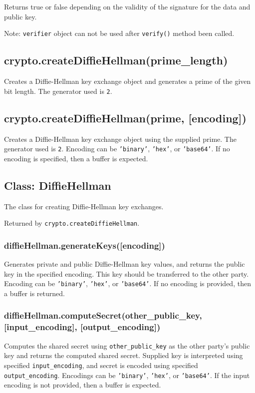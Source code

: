 Returns true or false depending on the validity of the signature for the
data and public key.

Note: \texttt{verifier} object can not be used after \texttt{verify()}
method been called.

\subsection{crypto.createDiffieHellman(prime\_length)}

Creates a Diffie-Hellman key exchange object and generates a prime of
the given bit length. The generator used is \texttt{2}.

\subsection{crypto.createDiffieHellman(prime, {[}encoding{]})}

Creates a Diffie-Hellman key exchange object using the supplied prime.
The generator used is \texttt{2}. Encoding can be \texttt{'binary'},
\texttt{'hex'}, or \texttt{'base64'}. If no encoding is specified, then
a buffer is expected.

\subsection{Class: DiffieHellman}

The class for creating Diffie-Hellman key exchanges.

Returned by \texttt{crypto.createDiffieHellman}.

\subsubsection{diffieHellman.generateKeys({[}encoding{]})}

Generates private and public Diffie-Hellman key values, and returns the
public key in the specified encoding. This key should be transferred to
the other party. Encoding can be \texttt{'binary'}, \texttt{'hex'}, or
\texttt{'base64'}. If no encoding is provided, then a buffer is
returned.

\subsubsection{diffieHellman.computeSecret(other\_public\_key,
{[}input\_encoding{]}, {[}output\_encoding{]})}

Computes the shared secret using \texttt{other\_public\_key} as the
other party's public key and returns the computed shared secret.
Supplied key is interpreted using specified \texttt{input\_encoding},
and secret is encoded using specified \texttt{output\_encoding}.
Encodings can be \texttt{'binary'}, \texttt{'hex'}, or
\texttt{'base64'}. If the input encoding is not provided, then a buffer
is expected.

